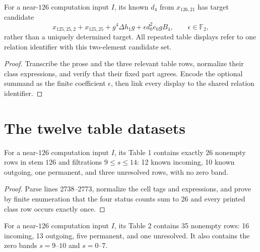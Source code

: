 \begin{proposition}
  \label{prop:x12621-ambiguity}
  \notready
  For a near-$126$ computation input $I$, its known $d_4$ from $x_{126,21}$ has
  target candidate
  \[
    x_{125,25,2}+x_{125,25}+g^4\Delta h_1g
      +\epsilon d_0^2e_0gB_4,
    \qquad \epsilon\in\mathbb F_2,
  \]
  rather than a uniquely determined target.  All repeated table displays
  refer to one relation identifier with this two-element candidate set.
\end{proposition}

\begin{proof}
  Transcribe the prose and the three relevant table rows, normalize their class
  expressions, and verify that their fixed part agrees.  Encode the optional
  summand as the finite coefficient $\epsilon$, then link every display to the
  shared relation identifier.
\end{proof}

\section{The twelve table datasets}

\begin{proposition}
  \label{data:table-cnu126}
  \notready
  For a near-$126$ computation input $I$, its Table 1 contains exactly 26
  nonempty rows in stem $126$ and filtrations
  $9\le s\le14$: 12 known incoming, 10 known outgoing, one permanent, and
  three unresolved rows, with no zero band.
\end{proposition}

\begin{proof}
  Parse lines 2738--2773, normalize the cell tags and expressions, and prove
  by finite enumeration that the four status counts sum to 26 and every
  printed class row occurs exactly once.
\end{proof}

\begin{proposition}
  \label{data:table-s122}
  \notready
  For a near-$126$ computation input $I$, its Table 2 contains 35 nonempty
  rows: 16 incoming, 13 outgoing, five permanent, and one unresolved.  It also
  contains the zero bands $s=9$--$10$ and $s=0$--$7$.
\end{proposition}

